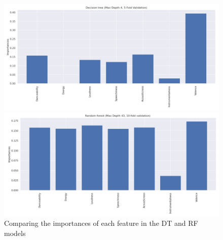 \documentclass{article}
\begin{document}




\begin{figure}[htbp]
\centering
\begin{minipage}{1\textwidth}
  \centering
  \includegraphics[width=1\linewidth]{Figures/DT_importances.png}
\end{minipage}
\begin{minipage}{1\textwidth}
  \centering
  \includegraphics[width=1\linewidth]{Figures/RF_importances.png}
\end{minipage}
\caption{Comparing the importances of each feature in the DT and RF models}
\label{fig:Importances}
\end{figure}
\end{document}
